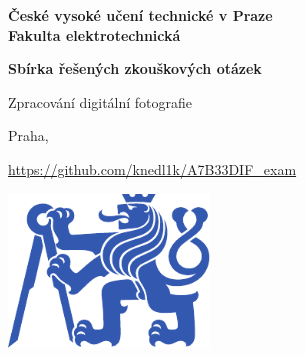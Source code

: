 \documentclass[11pt,a4paper]{article}
\begin{document}
\begin{titlepage}
    \centering
    \vspace*{2cm}

    {\Large \textbf{České vysoké učení technické v Praze}\\}
    \vspace{0.2cm}
    {\Large \textbf{Fakulta elektrotechnická}\\}
    
    \vspace{1cm}
    {\Huge \textbf{Sbírka řešených zkouškových otázek}\\}

    \vspace{0.5cm}
    {\Large Zpracování digitální fotografie\\}

    \vspace{2cm}
    { Praha, \the\year\\}

    \vspace{2cm}
    { \url{https://github.com/knedl1k/A7B33DIF_exam}}

    \vspace{2cm}
    \includegraphics[width=0.4\textwidth]{media/symbol_cvut_plna_samostatna_verze_Pantone.pdf}

    \vfill
    
\end{titlepage}

\clearpage
{}
\setcounter{page}{1}

\tableofcontents
{}

\clearpage
{}
\setcounter{page}{1} 



\end{document}
